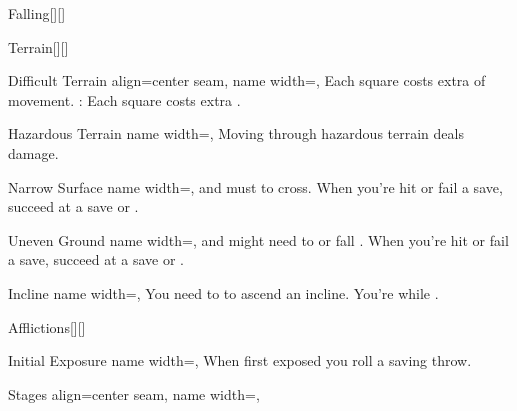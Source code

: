 \begin{PageBackLandscape}
\begin{TablesHalf}{\backTableHeight}
\begin{Table}{Falling}[][]
        \end{Table}\TableSpace
        \begin{Table}{Terrain}[][]
            \begin{entry}{Difficult Terrain}{%
                align=center seam,
                name width=\turnLength,}
                Each square costs  extra \Feet of movement. \hfill
                {\textbf{}}: Each square costs  extra \Feet. \\\hfill
            \end{entry}
            \begin{entry}{Hazardous Terrain}{%
                name width=\turnLength,}
                Moving through hazardous terrain deals damage.
            \end{entry}
            \begin{entry}{Narrow Surface}{%
                name width=\turnLength,}
                \OffGuard and must  to cross. When you're hit or fail a save, succeed at a \ReflexT save or .
            \end{entry}
            \begin{entry}{Uneven Ground}{%
                name width=\turnLength,}
                \OffGuard and might need to  or fall \Prone. When you're hit or fail a save, succeed at a \ReflexT save or .
            \end{entry}
            \begin{entry}{Incline}{%
                name width=\turnLength,}
                You need to  to ascend an incline. You're \OffGuard while .
            \end{entry}
        \end{Table}\TableSpace
        \begin{Table}{Afflictions}[][]
            \begin{entry}{Initial Exposure}{%
                name width=\turnLength,%
            }
                When first exposed you roll a saving throw.   \hfill
            \end{entry}
            \begin{entry}{Stages}{%
                align=center seam,
                name width=\turnLength,}

\end{entry}
\end{Table}
\end{TablesHalf}
\end{PageBackLandscape}
